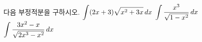다음 부정적분을 구하시오.
 $\displaystyle\int(2x+3)\sqrt{x^2+3x}\mkern3mu dx$
 $\displaystyle\int\dfrac{x^3}{\sqrt{1-x^2}}\mkern3mu dx$
 $\displaystyle\int\dfrac{3x^2-x}{\sqrt{2x^3-x^2}}\mkern3mu dx$
